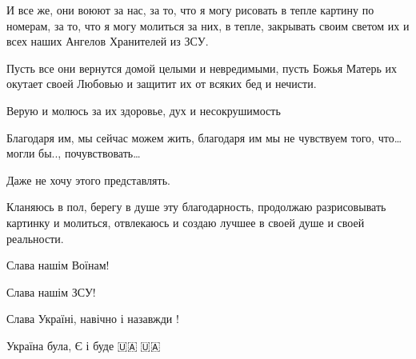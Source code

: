 И все же, они воюют за нас, за то, что я могу рисовать в тепле картину по
номерам, за то, что я могу молиться за них, в тепле, закрывать своим светом их
и всех наших Ангелов Хранителей из ЗСУ.

Пусть все они вернутся домой целыми и невредимыми, пусть Божья Матерь их
окутает своей Любовью и защитит их от всяких бед и нечисти.

Верую и молюсь за их здоровье, дух и несокрушимость 🙏🏻

Благодаря им, мы сейчас можем жить, благодаря им мы не чувствуем того, что…
могли бы.., почувствовать…

Даже не хочу этого представлять.

Кланяюсь в пол, берегу в душе эту благодарность, продолжаю разрисовывать
картинку и молиться, отвлекаюсь и создаю лучшее в своей душе и своей
реальности. 

Слава нашім Воїнам!

Слава нашім ЗСУ!

Слава Україні, навічно і назавжди !

Україна була, Є і буде 🇺🇦💙🇺🇦💛
